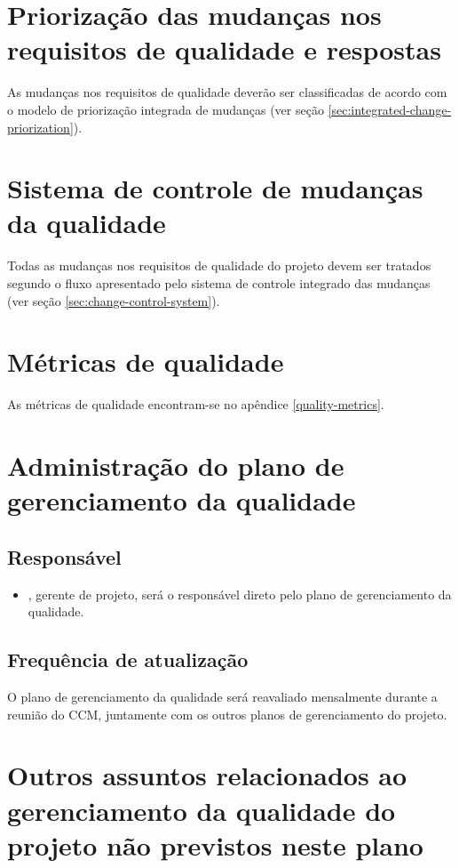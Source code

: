 \section{Priorização das mudanças nos requisitos de qualidade e respostas}

As mudanças nos requisitos de qualidade deverão ser classificadas de acordo com o modelo de priorização integrada de mudanças (ver seção \ref{sec:integrated-change-priorization}).

\section{Sistema de controle de mudanças da qualidade}

Todas as mudanças nos requisitos de qualidade do projeto devem ser tratados segundo o fluxo apresentado pelo sistema de controle integrado das mudanças (ver seção \ref{sec:change-control-system}).

\section{Métricas de qualidade}

As métricas de qualidade encontram-se no apêndice \ref{quality-metrics}.

\section{Administração do plano de gerenciamento da qualidade}

\subsection{Responsável}

\begin{itemize}
	\item \projectManagerName, gerente de projeto, será o responsável direto pelo plano de gerenciamento da qualidade.
\end{itemize}

\subsection{Frequência de atualização}

O plano de gerenciamento da qualidade será reavaliado mensalmente durante a reunião do CCM, juntamente com os outros planos de gerenciamento do projeto.

\section{Outros assuntos relacionados ao gerenciamento da qualidade do projeto não previstos neste plano}

